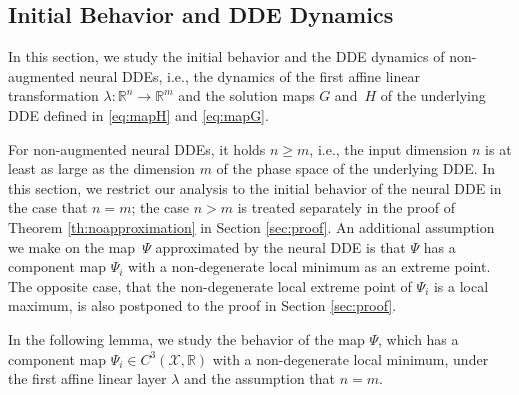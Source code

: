 \documentclass[10pt]{article}
\numberwithin{equation}{section}
\begin{document}
	\subsection{Initial Behavior and DDE Dynamics}
	\label{sec:initialbehavior}
	
	In this section, we study the initial behavior and the DDE dynamics of non-augmented neural DDEs, i.e., the dynamics of the first affine linear transformation $\lambda: \mathbb{R}^n\rightarrow \mathbb{R}^m$ and the solution maps $G$ and~$H$ of the underlying DDE defined in \eqref{eq:mapH} and \eqref{eq:mapG}. 
	
	For non-augmented neural DDEs, it holds $n \geq m$, i.e., the input dimension $n$ is at least as large as the dimension $m$ of the phase space of the underlying DDE. In this section, we restrict our analysis to the initial behavior of the neural DDE in the case that $n = m$; the case $n>m$ is treated separately in the proof of Theorem \ref{th:noapproximation} in Section \ref{sec:proof}. An additional assumption we make on the map~$\Psi$ approximated by the neural DDE is that $\Psi$ has a component map $\Psi_i$ with a non-degenerate local minimum as an extreme point. The opposite case, that the non-degenerate local extreme point of $\Psi_i$ is a local maximum, is also postponed to the proof in Section \ref{sec:proof}.
	
	In the following lemma, we study the behavior of the map $\Psi$, which has a component map $\Psi_i\in C^3(\mathcal{X}, \mathbb{R})$ with a non-degenerate local minimum, under the first affine linear layer $\lambda$ and the assumption that $n = m$.
	
\end{document}
